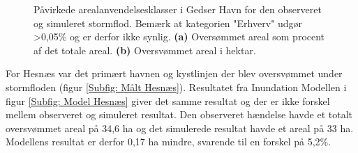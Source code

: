 \begin{figure}[H]
\begin{subfigure}[b]{0.5\textwidth}
        \caption{}
        \label{Subfig: Hektar areal Gedser}
    \end{subfigure}
    \caption{Påvirkede arealanvendelsesklasser i Gedser Havn for den observeret og simuleret stormflod. Bemærk at kategorien "Erhverv" udgør >0,05\% og er derfor ikke synlig. \textbf{(a)} Oversømmet areal som procent af det totale areal. \textbf{(b)} Oversvømmet areal i hektar.}
    \label{Figur: Påvirket arealanvendelse Gedser}
\end{figure}

For Hesnæs var det primært havnen og kystlinjen der blev oversvømmet under stormfloden (figur \ref{Subfig: Målt Hesnæs}). Resultatet fra Inundation Modellen i figur \ref{Subfig: Model Hesnæs} giver det samme resultat og der er ikke forskel mellem observeret og simuleret resultat. Den observeret hændelse havde et totalt oversvømmet areal på 34,6 ha og det simulerede resultat havde et areal på 33 ha. Modellens resultat er derfor 0,17 ha mindre, svarende til en forskel på 5,2\%.
